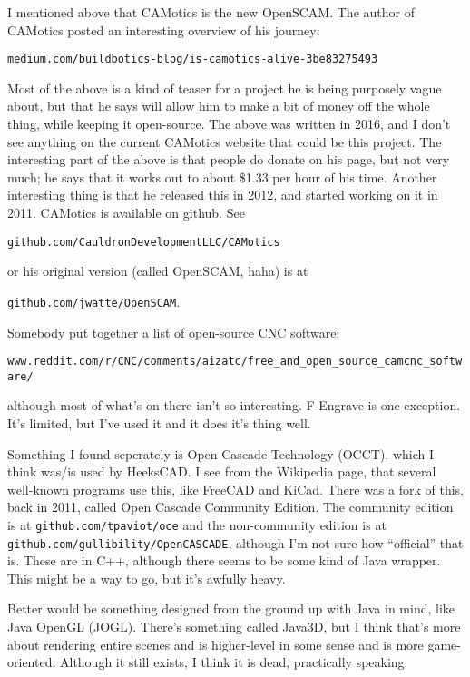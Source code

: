 \documentclass{article}
\begin{document}
I mentioned above that CAMotics is the new OpenSCAM. The author of
CAMotics posted an interesting overview of his journey:

\noindent\verb=medium.com/buildbotics-blog/is-camotics-alive-3be83275493=

\noindent Most of the above is a kind of teaser for a project he is
being purposely vague about, but that he says will allow him to make a
bit of money off the whole thing, while keeping it open-source. The
above was written in 2016, and I don't see anything on the current
CAMotics website that could be this project. The
interesting part of the above is that people do donate on his page,
but not very much; he says that it works out to about \$1.33 per
hour of his time. Another interesting thing is that he released this
in 2012, and started working on it in 2011. CAMotics is available on
github. See

\noindent\verb=github.com/CauldronDevelopmentLLC/CAMotics=

\noindent or his original version (called OpenSCAM, haha) is at

\noindent\verb=github.com/jwatte/OpenSCAM=.

Somebody put together a list of open-source CNC software:

\noindent\verb=www.reddit.com/r/CNC/comments/aizatc/free_and_open_source_camcnc_software/=

\noindent although most of what's on there isn't so
interesting. F-Engrave is one exception. It's limited, but I've used
it and it does it's thing well.

Something I found seperately is Open Cascade Technology (OCCT), which
I think was/is used by HeeksCAD. I see from the Wikipedia page, that
several well-known programs use this, like FreeCAD and KiCad. There
was a fork of this, back in 2011, called Open Cascade Community
Edition. The community edition is at \verb=github.com/tpaviot/oce= and
the non-community edition is at
\verb=github.com/gullibility/OpenCASCADE=, although I'm not sure how
``official'' that is. These are in C++, although there seems to be
some kind of Java wrapper. This might be a way to go, but it's awfully
heavy.

Better would be something designed from the ground up with Java in
mind, like Java OpenGL (JOGL). There's something called Java3D, but I
think that's more about rendering entire scenes and is higher-level in
some sense and is more game-oriented. Although it still exists, I
think it is dead, practically speaking.
\end{document}
